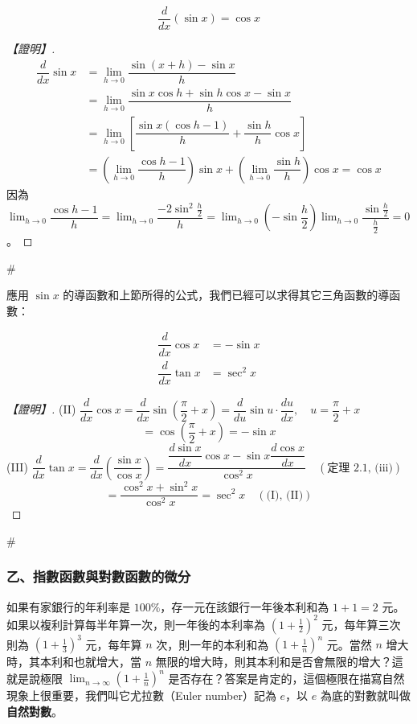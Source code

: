 \begin{theorem}\label{thm:b6s-app4-deriv-sin}
\[ \dfrac{d}{dx}(\sin x) = \cos x \tag{I} \]
\end{theorem}

\begin{proof}[【證明】]
\begin{align*}
\dfrac{d}{dx}\sin x &= \lim_{h\to 0}\dfrac{\sin(x+h)-\sin x}{h} \\
&= \lim_{h\to 0}\dfrac{\sin x\cos h + \sin h\cos x - \sin x}{h} \\
&= \lim_{h\to 0}\left[\dfrac{\sin x(\cos h - 1)}{h} + \dfrac{\sin h}{h}\cos x\right] \\
&= \left(\lim_{h\to 0}\dfrac{\cos h - 1}{h}\right)\sin x + \left(\lim_{h\to 0}\dfrac{\sin h}{h}\right)\cos x = \cos x
\end{align*}
因為 $\lim_{h\to 0}\dfrac{\cos h - 1}{h} = \lim_{h\to 0}\dfrac{-2\sin^2\frac{h}{2}}{h} = \lim_{h\to 0}\left(-\sin\dfrac{h}{2}\right)\lim_{h\to 0}\dfrac{\sin\frac{h}{2}}{\frac{h}{2}} = 0$。
\end{proof}\hfill$\#$

應用 $\sin x$ 的導函數和上節所得的公式，我們已經可以求得其它三角函數的導函數：

\begin{theorem}\label{thm:b6s-app4-deriv-trig-other}
\begin{align*}
\dfrac{d}{dx}\cos x &= -\sin x \tag{II} \\
\dfrac{d}{dx}\tan x &= \sec^2 x \tag{III}
\end{align*}
\end{theorem}

\begin{proof}[【證明】]
(II) $\dfrac{d}{dx}\cos x = \dfrac{d}{dx}\sin\left(\dfrac{\pi}{2}+x\right) = \dfrac{d}{du}\sin u\cdot\dfrac{du}{dx}, \quad u=\dfrac{\pi}{2}+x$
\[ = \cos\left(\dfrac{\pi}{2}+x\right) = -\sin x \]
(III) $\dfrac{d}{dx}\tan x = \dfrac{d}{dx}\left(\dfrac{\sin x}{\cos x}\right) = \dfrac{\dfrac{d\sin x}{dx}\cos x - \sin x\dfrac{d\cos x}{dx}}{\cos^2 x} \quad (\text{定理 2.1, (iii)})$
\[ = \dfrac{\cos^2 x + \sin^2 x}{\cos^2 x} = \sec^2 x \quad (\text{(I), (II)}) \]
\end{proof}\hfill$\#$

\subsubsection*{乙、指數函數與對數函數的微分}

如果有家銀行的年利率是 $100\%$，存一元在該銀行一年後本利和為 $1+1=2$ 元。如果以複利計算每半年算一次，則一年後的本利率為 $\left(1+\frac{1}{2}\right)^2$ 元，每年算三次則為 $\left(1+\frac{1}{3}\right)^3$ 元，每年算 $n$ 次，則一年的本利和為 $\left(1+\frac{1}{n}\right)^n$ 元。當然 $n$ 增大時，其本利和也就增大，當 $n$ 無限的增大時，則其本利和是否會無限的增大？這就是說極限 $\lim_{n\to\infty}\left(1+\frac{1}{n}\right)^n$ 是否存在？答案是肯定的，這個極限在描寫自然現象上很重要，我們叫它尤拉數（Euler number）記為 $e$，以 $e$ 為底的對數就叫做\textbf{自然對數}。

